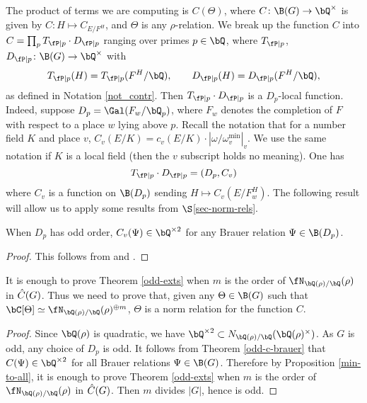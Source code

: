 The product of terms we are computing is $C(\Theta)$, where $C \colon \B(G) \to \bQ^{\times}$ is given by $C \colon H \mapsto C_{E / F^H}$, and $\Theta$ is any $\rho$-relation.
We break up the function $C$ into $C = \prod_p  T_{\fP \mid p} \cdot D_{\fP \mid p}$ ranging over primes $p \in \bQ$, where $T_{\fP | p}$, $D_{\fP \mid p} \colon \B(G) \to \bQ^{\times}$ with
\begin{equation}\label{c-and-d}
         T_{\fP \mid p}(H) = T_{\fP \mid p}(F^H / \bQ), \qquad D_{\fP \mid p}(H) = D_{\fP \mid p}(F^H / \bQ), 
\end{equation}
as defined in Notation \ref{not_contr}.
Then $T_{\fP \mid p} \cdot D_{\fP \mid p}$ is a $D_p$-local function. Indeed, suppose $D_p = \Gal(F_w / \bQ_p)$, where $F_w$ denotes the completion of $F$ with respect to a place $w$ lying above $p$. Recall the notation that for a number field $K$ and place $v$, $C_v(E / K) = c_v(E / K) \cdot \left| \omega / \omega_v^{\min} \right|_v.$ We use the same notation if $K$ is a local field (then the $v$ subscript holds no meaning).
One has
\begin{equation*}\label{Dp-loc}
T_{\fP \mid p} \cdot D_{\fP \mid p} = (D_p, C_v)
\end{equation*}
where $C_v$ is a function on $\B(D_p)$ sending $H \mapsto C_v(E / F_w^H)$. The following result will allow us to apply some results from $\S$\ref{sec-norm-rels}.

\begin{thm}\label{odd-c-brauer}
    When $D_p$ has odd order, $C_v(\Psi) \in \bQ^{\times 2}$ for any Brauer relation $\Psi \in \B(D_p)$. 
\end{thm}

\begin{proof}
    This follows from \cite[Theorem 2.47]{reg-const} and \cite[Theorem 3.2  (Tam)]{reg-const}.
\end{proof}

\begin{cor}
It is enough to prove Theorem \ref{odd-exts} when $m$ is the order of $\repnorm{\rho}$ in $\hat{C}(G)$. Thus we need to prove that, given any $
\Theta \in \B(G)$ such that $\bC[\Theta] \simeq \repnorm{\rho}^{\oplus m}$, $\Theta$ is a norm relation for the function $C$. 
\end{cor}

\begin{proof}
    Since $\bQ(\rho)$ is quadratic, we have $\bQ^{\times 2} \subset \fieldnorm{\rho}$. As $G$ is odd, any choice of $D_p$ is odd. It follows from Theorem \ref{odd-c-brauer} that $C(\Psi) \in \bQ^{\times 2}$ for all Brauer relations $\Psi \in \B(G)$. Therefore by Proposition \ref{min-to-all}, it is enough to prove Theorem \ref{odd-exts} when $m$ is the order of $\repnorm{\rho}$ in $\hat{C}(G)$. Then $m$ divides $|G|$, hence is odd.
\end{proof}

